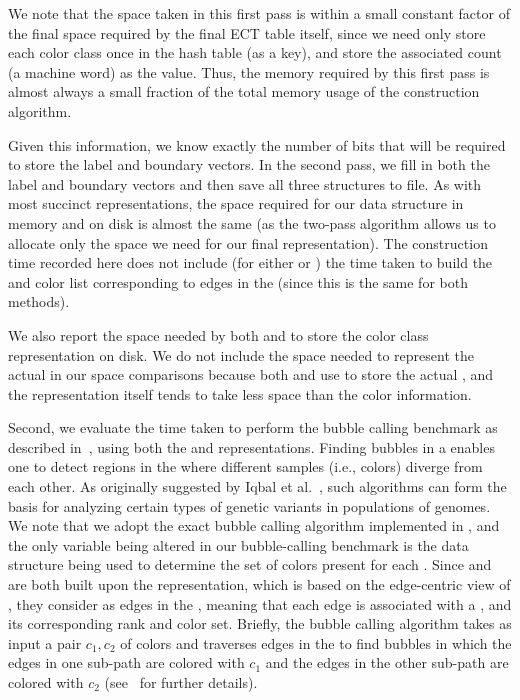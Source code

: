 We note that the space taken in this first pass is within a small constant
factor of the final space required by the final ECT table itself, since we need
only store each color class once in the hash table (as a key), and store the
associated count (a machine word) as the value.  Thus, the memory required by
this first pass is almost always a small fraction of the total memory usage 
of the construction algorithm.

Given this information, we know exactly the number of bits that will be required
to store the label and boundary vectors. In the second pass, we fill in both the
label and boundary vectors and then save all three structures to file. As with
most succinct representations, the space required for our data structure in
memory and on disk is almost the same (as the two-pass algorithm allows us to
allocate only the space we need for our final representation). The construction
time recorded here does not include (for either \system or \vari) the time taken
to build the \dbg and color list corresponding to edges in the \dbg (since this
is the same for both methods).

We also report the space needed by both \system and \vari to store the color class
representation on disk. We do not include the space needed to represent the
actual \dbg in our space comparisons because both \system and \vari use \boss
to store the actual \dbg, and the \boss representation itself tends to take less
space than the color information.

Second, we evaluate the time taken to perform the bubble calling benchmark as
described in~\cite{MuggliBoNo17}, using both the \vari and \system
representations. Finding bubbles in a \cdbg enables one to detect regions in the
\dbg where different samples (i.e., colors) diverge from each other. As
originally suggested by Iqbal et al.~\cite{Iqbal2012Novo}, such algorithms can
form the basis for analyzing certain types of genetic variants in populations of
genomes. We note that we adopt the exact bubble calling algorithm implemented in
\vari, and the only variable being altered in our bubble-calling benchmark is
the data structure being used to determine the set of colors present for each
\kmer. Since \vari and \system are both built upon the \boss representation,
which is based on the edge-centric view of \dbg, they consider \kmers as edges
in the \dbg, meaning that each edge is associated with a \kmer, and its
corresponding rank and color set. Briefly, the bubble calling algorithm takes as
input a pair $c_1,c_2$ of colors and traverses edges in the \dbg to find bubbles
in which the edges in one sub-path are colored with $c_1$ and the edges in the
other sub-path are colored with $c_2$ (see~\cite{MuggliBoNo17} for further
details).

